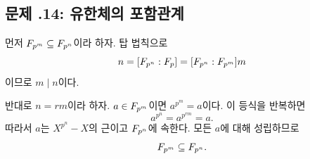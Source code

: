 \subsection*{문제 \thechapter.14: 유한체의 포함관계}

\begin{solution}
먼저 $F_{p^m}\subseteq F_{p^n}$이라 하자. 탑 법칙으로
\[
  n=[F_{p^n}:F_p]
  =[F_{p^n}:F_{p^m}]m
\]
이므로 $m\mid n$이다.

반대로 $n=rm$이라 하자. $a\in F_{p^m}$이면 $a^{p^m}=a$이다. 이 등식을 반복하면
\[
  a^{p^n}=a^{p^{rm}}=a.
\]
따라서 $a$는 $X^{p^n}-X$의 근이고 $F_{p^n}$에 속한다. 모든 $a$에 대해 성립하므로
\[
  F_{p^m}\subseteq F_{p^n}.
\]
\end{solution}
